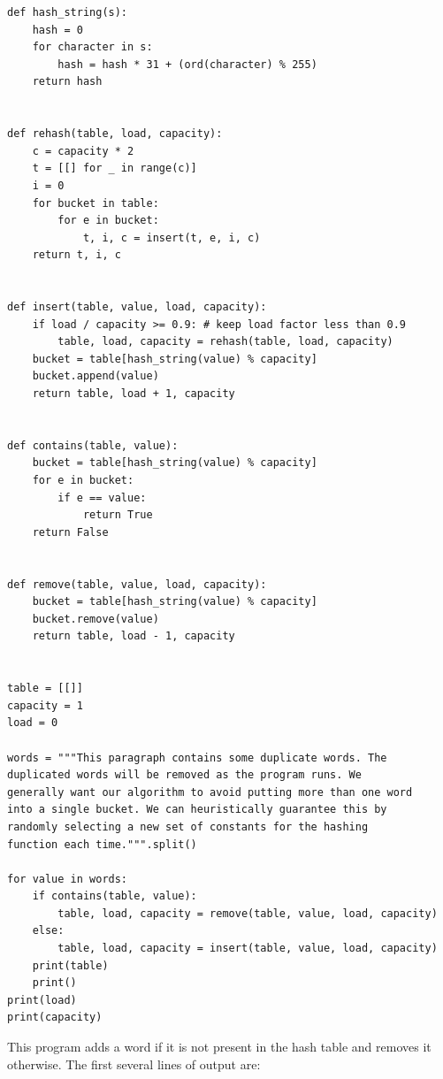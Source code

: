 \documentclass{book}
\begin{document}
\begin{lstlisting}
def hash_string(s):
    hash = 0
    for character in s:
        hash = hash * 31 + (ord(character) % 255)
    return hash


def rehash(table, load, capacity):
    c = capacity * 2
    t = [[] for _ in range(c)]
    i = 0
    for bucket in table:
        for e in bucket:
            t, i, c = insert(t, e, i, c)
    return t, i, c


def insert(table, value, load, capacity):
    if load / capacity >= 0.9: # keep load factor less than 0.9
        table, load, capacity = rehash(table, load, capacity)
    bucket = table[hash_string(value) % capacity]
    bucket.append(value) 
    return table, load + 1, capacity


def contains(table, value):
    bucket = table[hash_string(value) % capacity]
    for e in bucket:
        if e == value:
            return True
    return False


def remove(table, value, load, capacity):
    bucket = table[hash_string(value) % capacity]
    bucket.remove(value)
    return table, load - 1, capacity


table = [[]]
capacity = 1
load = 0

words = """This paragraph contains some duplicate words. The
duplicated words will be removed as the program runs. We
generally want our algorithm to avoid putting more than one word
into a single bucket. We can heuristically guarantee this by
randomly selecting a new set of constants for the hashing
function each time.""".split()

for value in words:
    if contains(table, value):
        table, load, capacity = remove(table, value, load, capacity)
    else:
        table, load, capacity = insert(table, value, load, capacity)
    print(table)
    print()
print(load)
print(capacity)
\end{lstlisting}

This program adds a word if it is not present in the hash table and removes it otherwise. The first several lines of output are:
\end{document}
